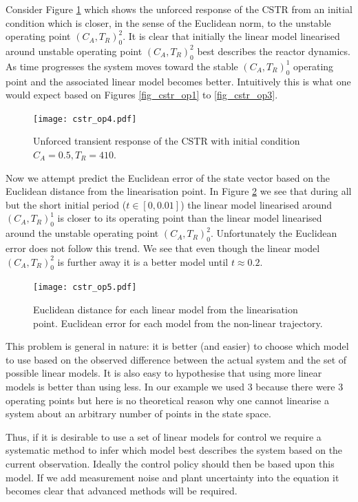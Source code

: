 \documentclass[../masters.tex]{subfiles}
\begin{document}
Consider Figure \ref{fig_cstr_op4} which shows the unforced response of the CSTR from an initial condition which is closer, in the sense of the Euclidean norm, to the unstable operating point $(C_A, T_R)_0^2$. It is clear that initially the linear model linearised around unstable operating point $(C_A, T_R)_0^2$ best describes the reactor dynamics. As time progresses the system moves toward the stable $(C_A, T_R)_0^1$ operating point and the associated linear model becomes better. Intuitively this is what one would expect based on Figures \ref{fig_cstr_op1} to \ref{fig_cstr_op3}.
\begin{figure}[H] 
\centering
\texttt{[image: cstr\_op4.pdf]}
\caption{Unforced transient response of the CSTR with initial condition $C_A = 0.5,T_R=410$.}
\label{fig_cstr_op4}
\end{figure}
Now we attempt predict the Euclidean error of the state vector based on the Euclidean distance from the linearisation point. In Figure \ref{fig_cstr_op5} we see that during all but the short initial period ($t \in [0, 0.01]$) the linear model linearised around $(C_A, T_R)_0^1$ is closer to its operating point than the linear model linearised around the unstable operating point $(C_A, T_R)_0^2$. Unfortunately the Euclidean error does not follow this trend. We see that even though the linear model $(C_A, T_R)_0^2$ is further away it is a better model until $t \approx 0.2$.  
\begin{figure}[H] 
\centering
\texttt{[image: cstr\_op5.pdf]}
\caption{Euclidean distance for each linear model from the linearisation point. Euclidean error for each model from the non-linear trajectory.}
\label{fig_cstr_op5}
\end{figure}
This problem is general in nature: it is better (and easier) to choose which model to use based on the observed difference between the actual system and the set of possible linear models. It is also easy to hypothesise that using more linear models is better than using less. In our example we used 3 because there were 3 operating points but here is no theoretical reason why one cannot linearise a system about an arbitrary number of points in the state space.

Thus, if it is desirable to use a set of linear models for control we require a systematic method to infer which model best describes the system based on the current observation. Ideally the control policy should then be based upon this model. If we add measurement noise and plant uncertainty into the equation it becomes clear that advanced methods will be required. 

%
%
\end{document}
